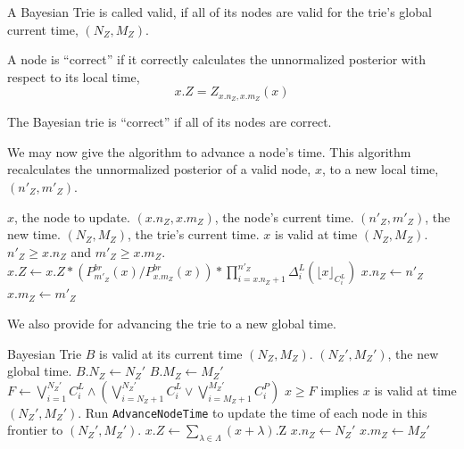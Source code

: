 \begin{definition}
    A Bayesian Trie is called valid, if all of its nodes are valid
    for the trie's global current time, $(N_Z, M_Z)$.
\end{definition}

\begin{definition}
    A node is ``correct'' if it correctly calculates the unnormalized posterior with respect to its local time,
    $$
    x.Z = Z_{x.n_Z, x.m_Z}(x)
    $$
\end{definition}

\begin{definition}
    The Bayesian trie is ``correct'' if all of its nodes are correct.
\end{definition}

We may now give the algorithm to advance a node's time.
This algorithm recalculates the unnormalized posterior
of a valid node, $x$, to a new local time, $(n'_Z, m'_Z)$.
\begin{algorithm}[H]
\caption{Advance Node Time}
\label{alg:advance-node-time}
\begin{algorithmic}[1]
\Require $x$, the node to update.
\Require $(x.n_Z, x.m_Z)$, the node's current time.
\Require $(n'_Z, m'_Z)$, the new time.
\Require $(N_Z, M_Z)$, the trie's current time.
\Require $x$ is valid at time $(N_Z, M_Z)$.
\Require $n'_Z \geq x.n_Z$ and $m'_Z \geq x.m_Z$.
\State $x.Z \gets
x.Z *
(P^{br}_{m'_Z}(x) / P^{br}_{x.m_Z}(x)) * 
\prod_{i=x.n_Z+1}^{n'_Z} \Delta^L_i(\lfloor x \rfloor_{C^L_i})
\label{alg:advance-node-time-recalculation}
$
\State $x.n_Z \gets n'_Z$
\State $x.m_Z \gets m'_Z$
\end{algorithmic}
\end{algorithm}


We also provide for advancing the trie to a new global time.

\begin{algorithm}[H]
\caption{Advance Trie Time}
\label{alg:advance-trie-time}
\begin{algorithmic}[1]
\Require Bayesian Trie $B$ is valid at its current time $(N_Z, M_Z)$.
\Require $(N_Z', M_Z')$, the new global time.
\State $B.N_Z \gets N_Z'$
\State $B.M_Z \gets M_Z'$
\State $F \gets \bigvee_{i=1}^{N_Z'} C^L_i \wedge \left(\bigvee_{i=N_Z+1}^{N_Z'} C^L_i \vee \bigvee_{i=M_Z+1}^{M_Z'} C^P_i\right)$
\Comment $x \geq F$ implies $x$ is valid at time $(N_Z', M_Z')$.
\State Run \texttt{AdvanceNodeTime} to update the time of
each node in this frontier to $(N_Z', M_Z')$.
    \State $x.Z \gets \sum_{\lambda \in \Lambda} (x+\lambda).\text{Z}$
    \label{alg:advance-trie-time-recalc-up-propagation}
    \State $x.n_Z \gets N_Z'$
    \State $x.m_Z \gets M_Z'$
\EndFor
\end{algorithmic}
\end{algorithm}


